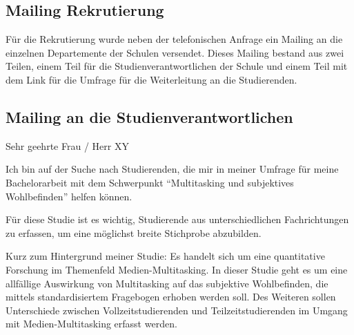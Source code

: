 %
%
\glsresetall
\let\raggedsection\centering 
{}\label{chap.anhang_b}
\let\raggedsection\raggedright 
\begin{RaggedRight}

\section{Mailing Rekrutierung}\label{appendix.mailing}
Für die Rekrutierung wurde neben der telefonischen Anfrage ein Mailing an die einzelnen Departemente der Schulen versendet. Dieses Mailing bestand aus zwei Teilen, einem Teil für die Studienverantwortlichen der Schule und einem Teil mit dem Link für die Umfrage für die Weiterleitung an die Studierenden.

\subsection{Mailing an die Studienverantwortlichen}\label{subsection.mailingVerantwortliche}
Sehr geehrte Frau / Herr XY

Ich bin auf der Suche nach Studierenden, die mir in meiner Umfrage für meine Bachelorarbeit mit dem Schwerpunkt “Multitasking und subjektives Wohlbefinden” helfen können.

Für diese Studie ist es wichtig, Studierende aus unterschiedlichen Fachrichtungen zu erfassen, um eine möglichst breite Stichprobe abzubilden.

Kurz zum Hintergrund meiner Studie: Es handelt sich um eine quantitative Forschung im Themenfeld Medien-Multitasking. In dieser Studie geht es um eine allfällige Auswirkung von Multitasking auf das subjektive Wohlbefinden, die mittels standardisiertem Fragebogen erhoben werden soll. Des Weiteren sollen Unterschiede zwischen Vollzeitstudierenden und Teilzeitstudierenden im Umgang mit Medien-Multitasking erfasst werden.


\end{RaggedRight}
